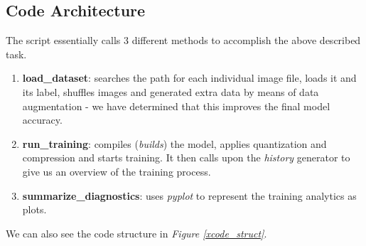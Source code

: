 \subsection{Code Architecture}
The script essentially calls 3 different methods to accomplish the above described task. 
\begin{enumerate}
    \item \textbf{load\_dataset}: searches the path for each individual image file, loads it and its label, shuffles images and generated extra data by means of data augmentation - we have determined that this improves the final model accuracy. 
    \item \textbf{run\_training}: compiles (\textit{builds}) the model, applies quantization and compression and starts training. It then calls upon the \textit{history} generator to give us an overview of the training process.
    \item \textbf{summarize\_diagnostics}: uses \textit{pyplot} to represent the training analytics as plots.
\end{enumerate}
We can also see the code structure in \textit{Figure \ref{xcode_struct}}.

